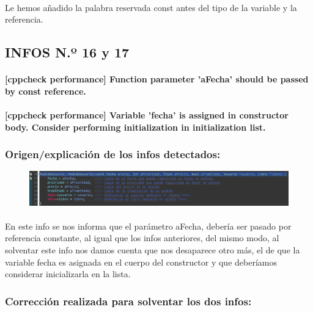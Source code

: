 			\paragraph{}Le hemos añadido la palabra reservada const antes del tipo de la variable y la referencia.
			
	\subsection{INFOS N.º 16 y 17}
	
		\paragraph{[cppcheck performance] Function parameter 'aFecha' should be passed by const reference.}
		
		\paragraph{[cppcheck performance] Variable 'fecha' is assigned in constructor body. Consider performing initialization in initialization list.}
	
		\subsubsection{Origen/explicación de los infos detectados:}
		
			\begin{figure}[H]
				\centering
				\includegraphics[scale=0.55]{img/esteban24.png}
				\label{esteban24}
			\end{figure}
		
			\paragraph{}En este info se nos informa que el parámetro aFecha, debería ser pasado por referencia constante, al igual que los infos anteriores, del mismo modo, al solventar este info nos damos cuenta que nos desaparece otro más, el de que la variable fecha es asignada en el cuerpo del constructor y que deberíamos considerar inicializarla en la lista.
			
		\subsubsection{Corrección realizada para solventar los dos infos:}
		
